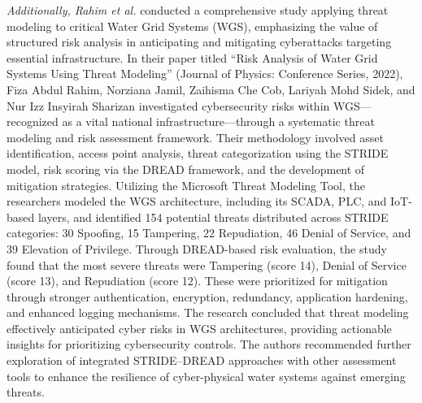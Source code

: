 \textit{Additionally, Rahim et al.} conducted a comprehensive study applying threat modeling to critical Water Grid Systems (WGS), emphasizing the value of structured risk analysis in anticipating and mitigating cyberattacks targeting essential infrastructure. In their paper titled ``Risk Analysis of Water Grid Systems Using Threat Modeling'' (Journal of Physics: Conference Series, 2022), Fiza Abdul Rahim, Norziana Jamil, Zaihisma Che Cob, Lariyah Mohd Sidek, and Nur Izz Insyirah Sharizan investigated cybersecurity risks within WGS—recognized as a vital national infrastructure—through a systematic threat modeling and risk assessment framework. Their methodology involved asset identification, access point analysis, threat categorization using the STRIDE model, risk scoring via the DREAD framework, and the development of mitigation strategies. Utilizing the Microsoft Threat Modeling Tool, the researchers modeled the WGS architecture, including its SCADA, PLC, and IoT-based layers, and identified 154 potential threats distributed across STRIDE categories: 30 Spoofing, 15 Tampering, 22 Repudiation, 46 Denial of Service, and 39 Elevation of Privilege. Through DREAD-based risk evaluation, the study found that the most severe threats were Tampering (score 14), Denial of Service (score 13), and Repudiation (score 12). These were prioritized for mitigation through stronger authentication, encryption, redundancy, application hardening, and enhanced logging mechanisms. The research concluded that threat modeling effectively anticipated cyber risks in WGS architectures, providing actionable insights for prioritizing cybersecurity controls. The authors recommended further exploration of integrated STRIDE–DREAD approaches with other assessment tools to enhance the resilience of cyber-physical water systems against emerging threats. \cite{rahim2022}

